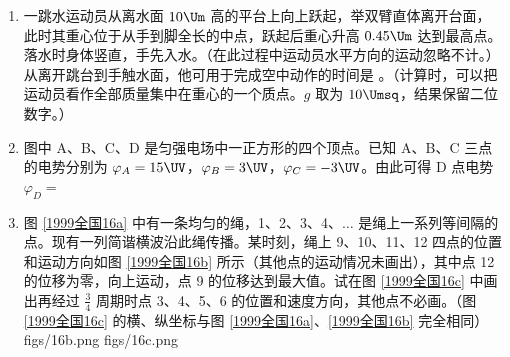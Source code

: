 \documentclass[\gkver]{gaokaozhenti}
\begin{document}
\begin{enumerate}
\item
一跳水运动员从离水面 $10\Um$ 高的平台上向上跃起，举双臂直体离开台面，此时其重心位于从手到脚全长的中点，跃起后重心升高 $0.45\Um$ 达到最高点。落水时身体竖直，手先入水。（在此过程中运动员水平方向的运动忽略不计。）从离开跳台到手触水面，他可用于完成空中动作的时间是 \tkanswer[1.5cm]{$1.7\Us$}。（计算时，可以把运动员看作全部质量集中在重心的一个质点。$g$ 取为 $10\Umsq$，结果保留二位数字。）

\item
图中 A、B、C、D 是匀强电场中一正方形的四个顶点。已知 A、B、C 三点的电势分别为 $\varphi_{A} = 15\UV$，$\varphi_{B} = 3\UV$，$\varphi_{C} = -3\UV$。由此可得 D 点电势 $\varphi_{D} =$ \tkanswer[1.2cm]{$9\UV$}
\onepicture[w=4.5cm, align=right]{}
\jdanswer{
$9\UV$
}

\item
图 \ref{1999全国16a} 中有一条均匀的绳，1、2、3、4、$\ldots$ 是绳上一系列等间隔的点。现有一列简谐横波沿此绳传播。某时刻，绳上 9、10、11、12 四点的位置和运动方向如图 \ref{1999全国16b} 所示（其他点的运动情况未画出），其中点 12 的位移为零，向上运动，点 9 的位移达到最大值。试在图 \ref{1999全国16c} 中画出再经过 $\frac{3}{4}$ 周期时点 3、4、5、6 的位置和速度方向，其他点不必画。（图 \ref{1999全国16c} 的横、纵坐标与图 \ref{1999全国16a}、\ref{1999全国16b} 完全相同）
{figs/16b.png}
{figs/16c.png}
\end{enumerate}
\end{document}

